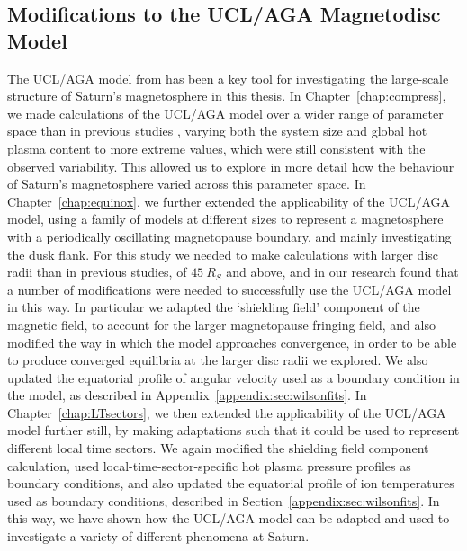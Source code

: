 \subsection{Modifications to the UCL/AGA Magnetodisc Model}
The UCL/AGA model from \citet{achilleos2010a} has been a key tool for investigating the large-scale structure of Saturn's magnetosphere in this thesis. In Chapter~\ref{chap:compress}, we made calculations of the UCL/AGA model over a wider range of parameter space than in previous studies \citep{achilleos2010a, achilleos2010b}, varying both the system size and global hot plasma content to more extreme values, which were still consistent with the observed variability. This allowed us to explore in more detail how the behaviour of Saturn's magnetosphere varied across this parameter space. In Chapter~\ref{chap:equinox}, we further extended the applicability of the UCL/AGA model, using a family of models at different sizes to represent a magnetosphere with a periodically oscillating magnetopause boundary, and mainly investigating the dusk flank. For this study we needed to make calculations with larger disc radii than in previous studies, of $\SI{45}{R_S}$ and above, and in our research found that a number of modifications were needed to successfully use the UCL/AGA model in this way. In particular we adapted the `shielding field' component of the magnetic field, to account for the larger magnetopause fringing field, and also modified the way in which the model approaches convergence, in order to be able to  produce converged equilibria at the larger disc radii we explored. We also updated the equatorial profile of angular velocity used as a boundary condition in the model, as described in Appendix~\ref{appendix:sec:wilsonfits}. In Chapter~\ref{chap:LTsectors}, we then extended the applicability of the  UCL/AGA model further still, by making adaptations such that it could be used to represent different local time sectors. We again modified the shielding field component calculation, used local-time-sector-specific hot plasma pressure profiles as boundary conditions, and also updated the equatorial profile of ion temperatures used as boundary conditions, described in Section~\ref{appendix:sec:wilsonfits}. In this way, we have shown how the UCL/AGA model can be adapted and used to investigate a variety of different phenomena at Saturn.

